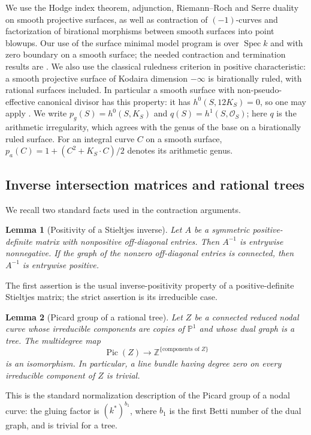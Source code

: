 \documentclass[11pt,reqno]{amsart}
\newtheorem{lemma}[lemma]{Lemma}
\theoremstyle{definition}
\theoremstyle{remark}
\DeclareMathOperator{\Pic}{Pic}
\newcommand{\PP}{\mathbb P}
\newcommand{\ZZ}{\mathbb Z}
\newcommand{\cO}{\mathcal O}
\numberwithin{equation}{section}
\begin{document}
We use the Hodge index theorem, adjunction, Riemann--Roch and Serre
duality on smooth projective surfaces, as well as contraction of
$(-1)$-curves and factorization of birational morphisms between smooth
surfaces into point blowups. Our use of the surface minimal model
program is over $\operatorname{Spec}k$ and with zero boundary on a
smooth surface; the needed contraction and termination results are
\cite[Theorems~4.4 and~1.1]{Tanaka}. We also use the classical
ruledness criterion in positive characteristic: a smooth projective
surface of Kodaira dimension $-\infty$ is birationally ruled, with
rational surfaces included. In particular a smooth surface with
non-pseudo-effective canonical divisor has this property: it has
$h^0(S,12K_S)=0$, so one may apply
\cite[Theorem~2.1\textup{(I)}]{CataneseLi}.
We write $p_g(S)=h^0(S,K_S)$ and $q(S)=h^1(S,\cO_S)$; here $q$ is
the arithmetic irregularity, which agrees with the genus of the base
on a birationally ruled surface. For an integral curve $C$ on a smooth
surface, $p_a(C)=1+(C^2+K_S\cdot C)/2$ denotes its arithmetic genus.

\subsection{Inverse intersection matrices and rational trees}
We recall two standard facts used in the contraction arguments.
\begin{lemma}[Positivity of a Stieltjes inverse]\label{lem:stieltjes}
Let $A$ be a symmetric positive-definite matrix with nonpositive off-diagonal entries.  Then $A^{-1}$ is entrywise nonnegative.  If the graph of the nonzero off-diagonal entries is connected, then $A^{-1}$ is entrywise positive.
\end{lemma}

The first assertion is the usual inverse-positivity property of a
positive-definite Stieltjes matrix; the strict assertion is its
irreducible case.

\begin{lemma}[Picard group of a rational tree]\label{lem:tree-picard}
Let $Z$ be a connected reduced nodal curve whose irreducible components are copies of $\PP^1$ and whose dual graph is a tree.  The multidegree map
\[
  \Pic(Z)\longrightarrow\ZZ^{\{\text{components of }Z\}}
\]
is an isomorphism.  In particular, a line bundle having degree zero on every irreducible component of $Z$ is trivial.
\end{lemma}

This is the standard normalization description of the Picard group of
a nodal curve: the gluing factor is $(k^*)^{b_1}$, where $b_1$ is the
first Betti number of the dual graph, and is trivial for a tree.
\end{document}
